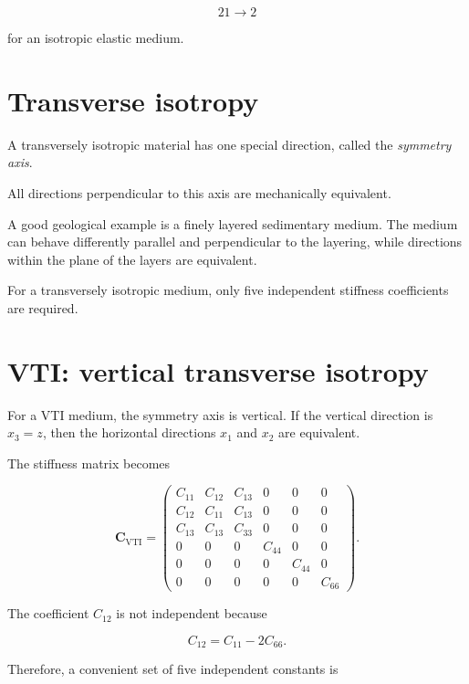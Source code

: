 \documentclass[11pt]{article}
\begin{document}
\begin{equation}
    21 \longrightarrow 2
\end{equation}

for an isotropic elastic medium.

\section{Transverse isotropy}

A transversely isotropic material has one special direction, called the \emph{symmetry axis}.

All directions perpendicular to this axis are mechanically equivalent.

A good geological example is a finely layered sedimentary medium. The medium can behave differently parallel and perpendicular to the layering, while directions within the plane of the layers are equivalent.

For a transversely isotropic medium, only five independent stiffness coefficients are required.

\section{VTI: vertical transverse isotropy}

For a VTI medium, the symmetry axis is vertical. If the vertical direction is $x_3=z$, then the horizontal directions $x_1$ and $x_2$ are equivalent.

The stiffness matrix becomes

\begin{equation}
\mathbf C_{\mathrm{VTI}}
=
\begin{pmatrix}
C_{11} & C_{12} & C_{13} & 0 & 0 & 0\\
C_{12} & C_{11} & C_{13} & 0 & 0 & 0\\
C_{13} & C_{13} & C_{33} & 0 & 0 & 0\\
0 & 0 & 0 & C_{44} & 0 & 0\\
0 & 0 & 0 & 0 & C_{44} & 0\\
0 & 0 & 0 & 0 & 0 & C_{66}
\end{pmatrix}.
\end{equation}

The coefficient $C_{12}$ is not independent because

\begin{equation}
    C_{12} = C_{11} - 2C_{66}.
\end{equation}

Therefore, a convenient set of five independent constants is
\end{document}
